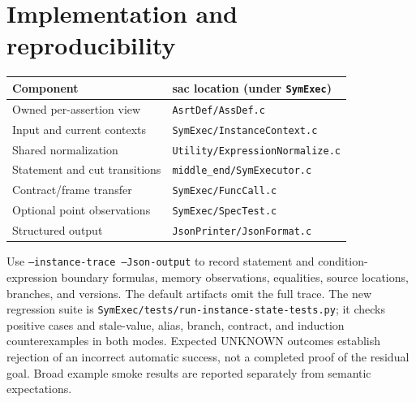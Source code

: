 \documentclass[10pt]{article}
\begin{document}
\section{Implementation and reproducibility}
\begin{center}
\begin{tabular}{ll}
\toprule
Component & sac location (under \texttt{SymExec})\\
\midrule
Owned per-assertion view & \texttt{AsrtDef/AssDef.c}\\
Input and current contexts & \texttt{SymExec/InstanceContext.c}\\
Shared normalization & \texttt{Utility/ExpressionNormalize.c}\\
Statement and cut transitions & \texttt{middle\_end/SymExecutor.c}\\
Contract/frame transfer & \texttt{SymExec/FuncCall.c}\\
Optional point observations & \texttt{SymExec/SpecTest.c}\\
Structured output & \texttt{JsonPrinter/JsonFormat.c}\\
\bottomrule
\end{tabular}
\end{center}
Use \texttt{--instance-trace --Json-output} to record statement and condition-expression boundary
formulas, memory observations, equalities, source locations, branches, and
versions. The default artifacts omit the full trace. The new regression suite
is \texttt{SymExec/tests/run-instance-state-tests.py}; it checks positive cases
and stale-value, alias, branch, contract, and induction counterexamples in both
modes. Expected UNKNOWN outcomes establish rejection of an incorrect automatic
success, not a completed proof of the residual goal. Broad example smoke
results are reported separately from semantic expectations.
\end{document}
